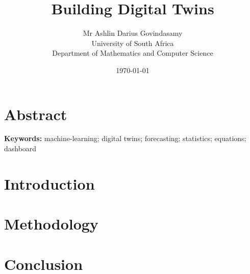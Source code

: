 \documentclass[12pt]{report}
\title{Building Digital Twins}
\author{Mr Ashlin Darius Govindasamy\\ \large{University of South Africa}\\ \small{Department of Mathematics and Computer Science}}
\date{\today}
\begin{document}
\maketitle
\newpage
{} 

\chapter*{Abstract}


\textbf{Keywords:} machine-learning; digital twins; forecasting; statistics; equations; dashboard




\tableofcontents

\chapter{Introduction}


\chapter{Methodology}


\chapter{Conclusion}


\newpage

 
 
\end{document}
